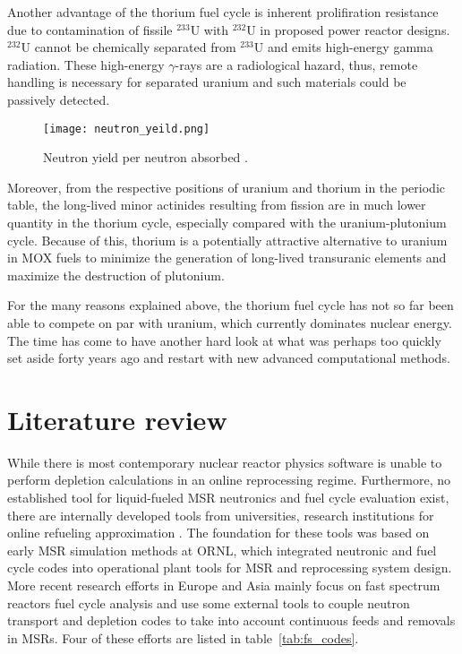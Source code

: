 Another advantage of the thorium fuel cycle is inherent prolifiration resistance due to contamination of fissile $^{233}$U with $^{232}$U in proposed power reactor designs. $^{232}$U cannot be chemically separated from $^{233}$U and  emits high-energy gamma radiation. These high-energy $\gamma$-rays are a radiological hazard, thus, remote handling is necessary for separated uranium and such materials could be passively detected.

\begin{figure}[htbp!] %
  \centering
  \vspace{-0.3em}
  \texttt{[image: neutron\_yeild.png]}
  \caption{Neutron yield per neutron absorbed \cite{anon_plutonium_1989}.}
  \vspace{-0.6em}
  \label{fig:n_yeild}
\end{figure}
\FloatBarrier

Moreover, from the respective positions of uranium and thorium in the periodic table, the long-lived minor actinides resulting from fission are in much lower quantity in the thorium cycle, especially compared with the uranium-plutonium cycle. Because of this, thorium is a potentially attractive alternative to uranium in \gls{MOX} fuels to minimize the generation of long-lived transuranic elements and maximize the destruction of plutonium.

For the many reasons explained above, the thorium fuel cycle has not so far been able to compete on par with uranium, which currently dominates nuclear energy. The time has come to have another hard look at what was perhaps too quickly set aside forty years ago and restart with new advanced computational methods. 

\section{Literature review}
While there is most contemporary nuclear reactor physics software is unable to perform depletion calculations in an online reprocessing regime. Furthermore, no established tool for liquid-fueled \gls{MSR} neutronics and fuel cycle evaluation exist, there are internally developed tools from universities, research institutions for online refueling approximation \cite{serp_molten_2014}. The foundation for these tools was based on early \gls{MSR} simulation methods at \gls{ORNL}, which integrated neutronic and fuel cycle codes \cite{bauman_rod:_1971} into operational plant tools \cite{kee_mrpp:_1976} for \gls{MSR} and reprocessing system design. More recent research efforts in Europe and Asia mainly focus on fast spectrum reactors fuel cycle analysis and use some external tools to couple neutron transport and depletion codes to take into account continuous feeds and removals in \glspl{MSR}. Four of these efforts are listed in table~\ref{tab:fs_codes}.

